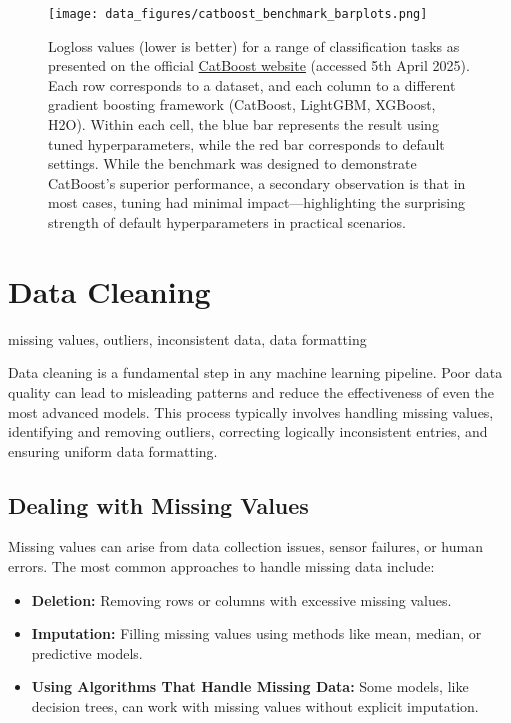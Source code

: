 \documentclass[12pt,openany]{book}
\begin{document}
\begin{figure}[H]
    \centering
    \texttt{[image: data\_figures/catboost\_benchmark\_barplots.png]}
    \caption{
    Logloss values (lower is better) for a range of classification tasks as presented on the official \href{https://catboost.ai/}{CatBoost website} (accessed 5th April 2025). Each row corresponds to a dataset, and each column to a different gradient boosting framework (CatBoost, LightGBM, XGBoost, H2O). Within each cell, the blue bar represents the result using tuned hyperparameters, while the red bar corresponds to default settings. While the benchmark was designed to demonstrate CatBoost’s superior performance, a secondary observation is that in most cases, tuning had minimal impact—highlighting the surprising strength of default hyperparameters in practical scenarios.
    }
    \label{fig:catboost-benchmark}
\end{figure}



\section{Data Cleaning}

\begin{keywordsbox}
missing values, outliers, inconsistent data, data formatting
\end{keywordsbox}

Data cleaning is a fundamental step in any machine learning pipeline. Poor data quality can lead to misleading patterns and reduce the effectiveness of even the most advanced models. This process typically involves handling missing values, identifying and removing outliers, correcting logically inconsistent entries, and ensuring uniform data formatting. \newline

\subsection{Dealing with Missing Values}
Missing values can arise from data collection issues, sensor failures, or human errors. The most common approaches to handle missing data include:

\begin{itemize}
    \item \textbf{Deletion:} Removing rows or columns with excessive missing values.
    \item \textbf{Imputation:} Filling missing values using methods like mean, median, or predictive models.
    \item \textbf{Using Algorithms That Handle Missing Data:} Some models, like decision trees, can work with missing values without explicit imputation.
\end{itemize}
\end{document}
